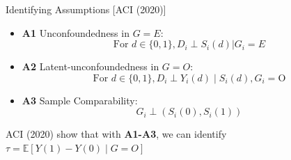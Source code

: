 \documentclass{beamer}					%
\newcommand{\Ep}{\mathbb{E}}
\begin{document}
\begin{frame}{Identifying Assumptions [ACI (2020)]}
    \begin{itemize}
        \item {\color{green}\textbf{A1}} Unconfoundedness in $G=E$:
        $$\text{For }d \in\{0,1\}, D_i \perp S_i(d) | G_i = E$$

        \item {\color{red}\textbf{A2}} Latent-unconfoundedness in $G=O$:
		$$
		\text{For }d \in\{0,1\}, D_{i} \perp Y_{i}(d) \mid S_i(d), G_{i}=\mathrm{O}
		$$
		
		\item {\color{red}\textbf{A3}} Sample Comparability: $$G_{i} \perp\left(S_{i}(0), S_{i}(1)\right)$$
    \end{itemize}
    \begin{center}
        ACI (2020) show that with \textbf{A1-A3}, we can identify $\tau = \Ep[Y(1) - Y(0) \mid G = O]$
    \end{center}
\end{frame}

        
        
		

\end{document}
